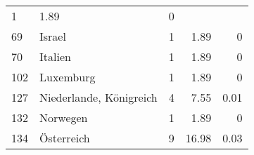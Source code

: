 \begin{longtable}{lXrrr}
       \num{1} &
       \num[round-mode=places,round-precision=2]{1,89} &
         \num[round-mode=places,round-precision=2]{0} \\

     69 &
     \multicolumn{1}{X}{ Israel   } &


       \num{1} &
       \num[round-mode=places,round-precision=2]{1,89} &
         \num[round-mode=places,round-precision=2]{0} \\

     70 &
     \multicolumn{1}{X}{ Italien   } &


       \num{1} &
       \num[round-mode=places,round-precision=2]{1,89} &
         \num[round-mode=places,round-precision=2]{0} \\

     102 &
     \multicolumn{1}{X}{ Luxemburg   } &


       \num{1} &
       \num[round-mode=places,round-precision=2]{1,89} &
         \num[round-mode=places,round-precision=2]{0} \\

     127 &
     \multicolumn{1}{X}{ Niederlande, Königreich   } &


       \num{4} &
       \num[round-mode=places,round-precision=2]{7,55} &
         \num[round-mode=places,round-precision=2]{0,01} \\

     132 &
     \multicolumn{1}{X}{ Norwegen   } &


       \num{1} &
       \num[round-mode=places,round-precision=2]{1,89} &
         \num[round-mode=places,round-precision=2]{0} \\

     134 &
     \multicolumn{1}{X}{ Österreich   } &


       \num{9} &
       \num[round-mode=places,round-precision=2]{16,98} &
         \num[round-mode=places,round-precision=2]{0,03} \\


\end{longtable}
